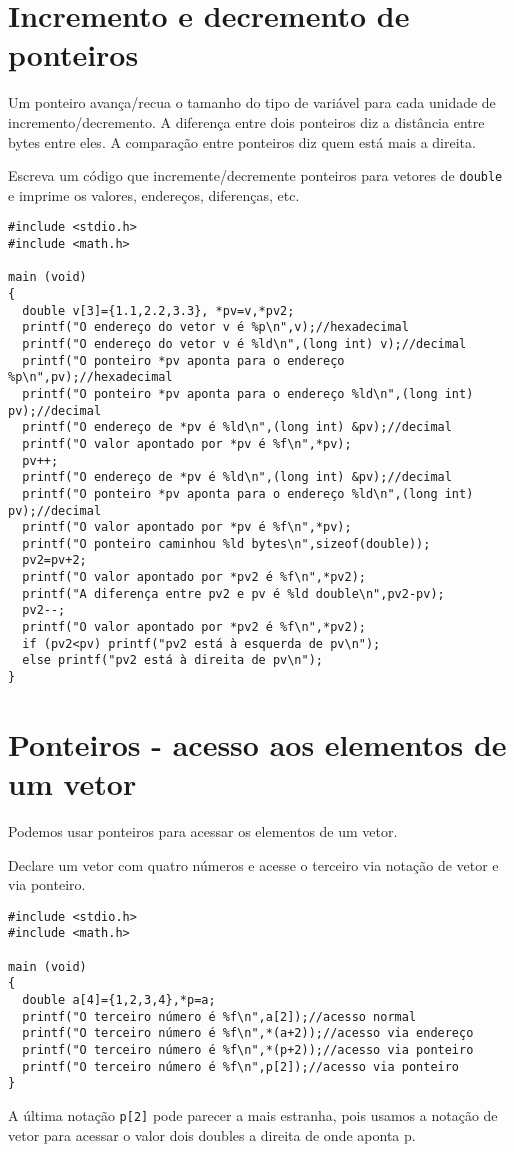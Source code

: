 \section{Incremento e decremento de ponteiros}
Um ponteiro avança/recua o tamanho do tipo de variável para cada unidade de incremento/decremento. A diferença entre dois ponteiros diz a distância entre bytes entre eles. A comparação entre ponteiros diz quem está mais a direita.
\begin{ex}
Escreva um código que incremente/decremente ponteiros para vetores de \verb|double| e imprime os valores, endereços, diferenças, etc.
\end{ex}
\begin{verbatim}
#include <stdio.h>
#include <math.h>

main (void)
{
  double v[3]={1.1,2.2,3.3}, *pv=v,*pv2;
  printf("O endereço do vetor v é %p\n",v);//hexadecimal
  printf("O endereço do vetor v é %ld\n",(long int) v);//decimal
  printf("O ponteiro *pv aponta para o endereço %p\n",pv);//hexadecimal
  printf("O ponteiro *pv aponta para o endereço %ld\n",(long int) pv);//decimal
  printf("O endereço de *pv é %ld\n",(long int) &pv);//decimal
  printf("O valor apontado por *pv é %f\n",*pv);
  pv++;
  printf("O endereço de *pv é %ld\n",(long int) &pv);//decimal
  printf("O ponteiro *pv aponta para o endereço %ld\n",(long int) pv);//decimal
  printf("O valor apontado por *pv é %f\n",*pv);
  printf("O ponteiro caminhou %ld bytes\n",sizeof(double));
  pv2=pv+2;
  printf("O valor apontado por *pv2 é %f\n",*pv2);
  printf("A diferença entre pv2 e pv é %ld double\n",pv2-pv);
  pv2--;
  printf("O valor apontado por *pv2 é %f\n",*pv2);
  if (pv2<pv) printf("pv2 está à esquerda de pv\n");
  else printf("pv2 está à direita de pv\n");
}
\end{verbatim}



\section{Ponteiros - acesso aos elementos de um vetor}
Podemos usar ponteiros para acessar os elementos de um vetor.
\begin{ex}
Declare um vetor com quatro números e acesse o terceiro via notação de vetor e via ponteiro.
\end{ex}
\begin{verbatim}
#include <stdio.h>
#include <math.h>

main (void)
{
  double a[4]={1,2,3,4},*p=a;
  printf("O terceiro número é %f\n",a[2]);//acesso normal
  printf("O terceiro número é %f\n",*(a+2));//acesso via endereço
  printf("O terceiro número é %f\n",*(p+2));//acesso via ponteiro
  printf("O terceiro número é %f\n",p[2]);//acesso via ponteiro
}
\end{verbatim}
A última notação \verb|p[2]| pode parecer a mais estranha, pois usamos a notação de vetor para acessar o valor dois doubles a direita de onde aponta p.


